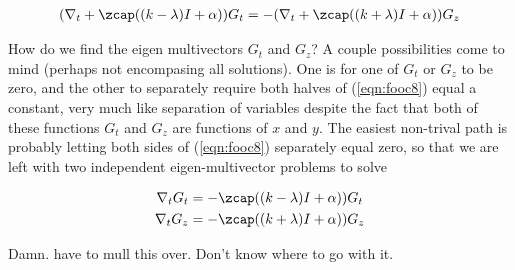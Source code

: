 \begin{align}\label{eqn:fooc8}
(\grad_t + \zcap ((k-\lambda) I + \alpha)) G_t = -(\grad_t + \zcap ((k+\lambda) I + \alpha)) G_z
\end{align}

How do we find the eigen multivectors $G_t$ and $G_z$?  A couple possibilities come to mind (perhaps not encompasing all solutions).  One is for one of $G_t$ or $G_z$ to be zero, and the other to separately require both halves of (\ref{eqn:fooc8}) equal a constant, very much like separation of variables despite the fact that both of these functions $G_t$ and $G_z$ are functions of $x$ and $y$.  The easiest non-trival path is probably letting both sides of (\ref{eqn:fooc8}) separately equal zero, so that we are left with two independent eigen-multivector problems to solve

\begin{align}\label{eqn:fooc9}
\grad_t G_t &= -\zcap ((k-\lambda) I + \alpha)) G_t \\
\grad_t G_z &= -\zcap ((k+\lambda) I + \alpha)) G_z
\end{align}

Damn.  have to mull this over.  Don't know where to go with it.

\EndArticle
